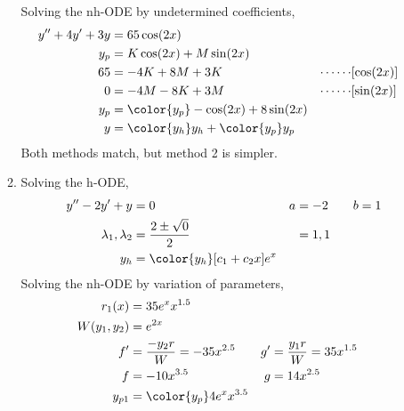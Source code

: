 \begin{enumerate}
\begin{enumerate}
                    Solving the nh-ODE by undetermined coefficients,
                    \begin{align}
                        y'' + 4y' + 3y & = 65\cos(2x)                                  \\
                        y_{p}          & = K\cos(2x) + M\sin(2x)                       \\
                        65             & =  -4K + 8M + 3K                            &
                        \cdots\cdots   & [\cos(2x)]                                    \\
                        0              & =  -4M - 8K + 3M                            &
                        \cdots\cdots   & [\sin(2x)]                                    \\
                        y_{p}          & = {\color{y_p} -\cos(2x) + 8\sin(2x)}         \\
                        y              & = {\color{y_h} y_{h}} + {\color{y_p} y_{p}}
                    \end{align}
                    Both methods match, but method 2 is simpler.

              \item Solving the h-ODE,
                    \begin{align}
                        y''  - 2y' + y           & = 0                        &
                        a                        & = -2 \qquad b = 1            \\
                        \lambda_{1}, \lambda_{2} & = \frac{2 \pm \sqrt{0}}{2} &
                                                 & = 1, 1                       \\
                        y_{h}                    & = {\color{y_h} [c_{1}
                            + c_{2}x]e^{x}}
                    \end{align}
                    Solving the nh-ODE by variation of parameters,
                    \begin{align}
                        r_{1}(x)        & = 35e^{x}x^{1.5}                   \\
                        W(y_{1}, y_{2}) & = e^{2x}                           \\
                        f'              & = \frac{-y_{2}r}{W} = -35x^{2.5} &
                        g'              & = \frac{y_{1}r}{W} = 35x^{1.5}     \\
                        f               & = -10x^{3.5}                     &
                        g               & = 14x^{2.5}                        \\
                        y_{p1}          & = {\color{y_p} 4e^{x}x^{3.5}}
                    \end{align}


\end{enumerate}
\end{enumerate}
